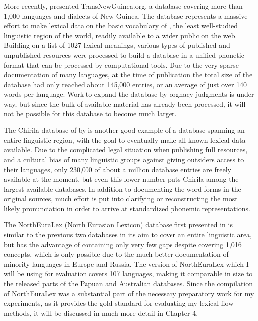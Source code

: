 More recently, \citet{greenhill2015} presented TransNewGuinea.org, a database covering more than 1,000 languages and dialects of New Guinea. The database represents a massive effort to make lexical data on the basic vocabulary of , the least well-studied linguistic region of the world, readily available to a wider public on the web. Building on a list of 1027 lexical meanings, various types of published and unpublished resources were processed to build a database in a unified phonetic format that can be processed by computational tools. Due to the very sparse documentation of many languages, at the time of publication the total size of the database had only reached about 145,000 entries, or an average of just over 140 words per language. Work to expand the database by cognacy judgments is under way, but since the bulk of available material has already been processed, it will not be possible for this database to become much larger.

The Chirila database of  by \citet{bowern2016} is another good example of a database spanning an entire linguistic region, with the goal to eventually make all known lexical data available. Due to the complicated legal situation when publishing full resources, and a cultural bias of many linguistic groups against giving outsiders access to their languages, only 230,000 of about a million database entries are freely available at the moment, but even this lower number puts Chirila among the largest available databases. In addition to documenting the word forms in the original sources, much effort is put into clarifying or reconstructing the most likely pronunciation in order to arrive at standardized phonemic representations.

The NorthEuraLex (North Eurasian Lexicon) database first presented in \citet{dellert2015a} is similar to the previous two databases in its aim to cover an entire linguistic area, but has the advantage of containing only very few gaps despite covering 1,016 concepts, which is only possible due to the much better documentation of minority languages in Europe and Russia. The version of NorthEuraLex which I will be using for evaluation covers 107 languages, making it comparable in size to the released parts of the Papuan and Australian databases. Since the compilation of NorthEuraLex was a substantial part of the necessary preparatory work for my experiments, as it provides the gold standard for evaluating my lexical flow methods, it will be discussed in much more detail in Chapter 4.

